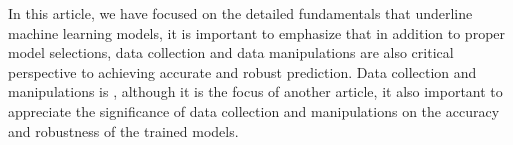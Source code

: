 
\par
In this article, we have focused on the detailed fundamentals that underline machine learning models, it is important to emphasize that in addition to proper model selections, data collection and data manipulations are also critical perspective to achieving accurate and robust prediction. Data collection and manipulations is , although it is the focus of another article, it also important to appreciate the significance of data collection and manipulations on the accuracy and robustness of the trained models.
\par 
